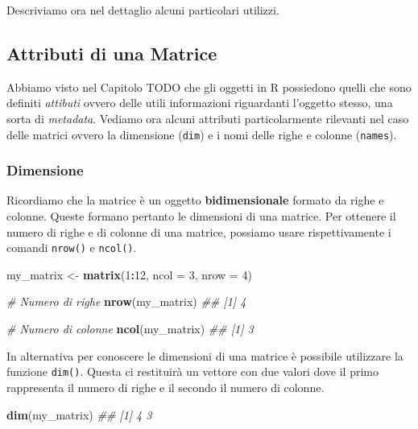 \documentclass[
]{book}
\newenvironment{Shaded}{\begin{snugshade}}{\end{snugshade}}
\newcommand{\CommentTok}[1]{\textcolor[rgb]{0.56,0.35,0.01}{\textit{#1}}}
\newcommand{\DataTypeTok}[1]{\textcolor[rgb]{0.13,0.29,0.53}{#1}}
\newcommand{\DecValTok}[1]{\textcolor[rgb]{0.00,0.00,0.81}{#1}}
\newcommand{\KeywordTok}[1]{\textcolor[rgb]{0.13,0.29,0.53}{\textbf{#1}}}
\newcommand{\NormalTok}[1]{#1}
\newcommand{\OperatorTok}[1]{\textcolor[rgb]{0.81,0.36,0.00}{\textbf{#1}}}
\newcommand{\StringTok}[1]{\textcolor[rgb]{0.31,0.60,0.02}{#1}}
\begin{document}
Descriviamo ora nel dettaglio alcuni particolari utilizzi.

\hypertarget{mat-prop}{%
\subsection{Attributi di una Matrice}\label{mat-prop}}

Abbiamo visto nel Capitolo TODO che gli oggetti in R possiedono quelli che sono definiti \emph{attibuti} ovvero delle utili informazioni riguardanti l'oggetto stesso, una sorta di \emph{metadata}. Vediamo ora alcuni attributi particolarmente rilevanti nel caso delle matrici ovvero la dimensione (\texttt{dim}) e i nomi delle righe e colonne (\texttt{names}).

\hypertarget{dimensione}{%
\subsubsection*{Dimensione}\label{dimensione}}

Ricordiamo che la matrice è un oggetto \textbf{bidimensionale} formato da righe e colonne. Queste formano pertanto le dimensioni di una matrice. Per ottenere il numero di righe e di colonne di una matrice, possiamo usare rispettivamente i comandi \texttt{nrow()} e \texttt{ncol()}.

\begin{Shaded}
\begin{Highlighting}[]
\NormalTok{my_matrix <-}\StringTok{ }\KeywordTok{matrix}\NormalTok{(}\DecValTok{1}\OperatorTok{:}\DecValTok{12}\NormalTok{, }\DataTypeTok{ncol =} \DecValTok{3}\NormalTok{, }\DataTypeTok{nrow =} \DecValTok{4}\NormalTok{)}

\CommentTok{# Numero di righe}
\KeywordTok{nrow}\NormalTok{(my_matrix)}
\CommentTok{## [1] 4}

\CommentTok{# Numero di colonne}
\KeywordTok{ncol}\NormalTok{(my_matrix)}
\CommentTok{## [1] 3}
\end{Highlighting}
\end{Shaded}

In alternativa per conoscere le dimensioni di una matrice è possibile utilizzare la funzione \texttt{dim()}. Questa ci restituirà un vettore con due valori dove il primo rappresenta il numero di righe e il secondo il numero di colonne.

\begin{Shaded}
\begin{Highlighting}[]
\KeywordTok{dim}\NormalTok{(my_matrix)}
\CommentTok{## [1] 4 3}
\end{Highlighting}
\end{Shaded}
\end{document}
